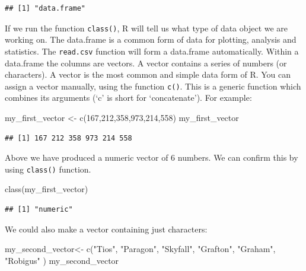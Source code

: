 \documentclass[
]{book}
\newenvironment{Shaded}{\begin{snugshade}}{\end{snugshade}}
\newcommand{\DecValTok}[1]{\textcolor[rgb]{0.00,0.00,0.81}{#1}}
\newcommand{\FunctionTok}[1]{\textcolor[rgb]{0.00,0.00,0.00}{#1}}
\newcommand{\NormalTok}[1]{#1}
\newcommand{\OtherTok}[1]{\textcolor[rgb]{0.56,0.35,0.01}{#1}}
\newcommand{\StringTok}[1]{\textcolor[rgb]{0.31,0.60,0.02}{#1}}
\begin{document}
\begin{verbatim}
## [1] "data.frame"
\end{verbatim}

If we run the function \texttt{class()}, R will tell us what type of data object we are working on. The data.frame is a common form of data for plotting, analysis and statistics. The \texttt{read.csv} function will form a data.frame automatically. Within a data.frame the columns are vectors. A vector contains a series of numbers (or characters). A vector is the most common and simple data form of R. You can assign a vector manually, using the function \texttt{c()}. This is a generic function which combines its arguments (`c' is short for `concatenate'). For example:

\begin{Shaded}
\begin{Highlighting}[]
\NormalTok{my\_first\_vector }\OtherTok{\textless{}{-}} \FunctionTok{c}\NormalTok{(}\DecValTok{167}\NormalTok{,}\DecValTok{212}\NormalTok{,}\DecValTok{358}\NormalTok{,}\DecValTok{973}\NormalTok{,}\DecValTok{214}\NormalTok{,}\DecValTok{558}\NormalTok{)}
\NormalTok{my\_first\_vector}
\end{Highlighting}
\end{Shaded}

\begin{verbatim}
## [1] 167 212 358 973 214 558
\end{verbatim}

Above we have produced a numeric vector of 6 numbers. We can confirm this by using \texttt{class()} function.

\begin{Shaded}
\begin{Highlighting}[]
\FunctionTok{class}\NormalTok{(my\_first\_vector)}
\end{Highlighting}
\end{Shaded}

\begin{verbatim}
## [1] "numeric"
\end{verbatim}

We could also make a vector containing just characters:

\begin{Shaded}
\begin{Highlighting}[]
\NormalTok{my\_second\_vector}\OtherTok{\textless{}{-}} \FunctionTok{c}\NormalTok{(}\StringTok{"Tios"}\NormalTok{, }\StringTok{"Paragon"}\NormalTok{, }\StringTok{"Skyfall"}\NormalTok{, }\StringTok{"Grafton"}\NormalTok{, }\StringTok{"Graham"}\NormalTok{, }\StringTok{"Robigus"}\NormalTok{ )}
\NormalTok{my\_second\_vector}
\end{Highlighting}
\end{Shaded}
\end{document}
